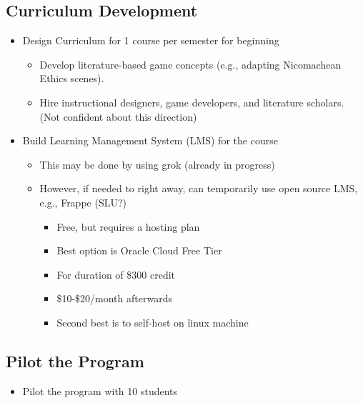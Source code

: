 \documentclass[
  letterpaper,
  DIV=11,
  numbers=noendperiod]{scrreprt}
\providecommand{\tightlist}{%
  \setlength{\itemsep}{0pt}\setlength{\parskip}{0pt}}\usepackage{longtable,booktabs,array}
\begin{document}
\begin{tcolorbox}[enhanced jigsaw, arc=.35mm, breakable, rightrule=.15mm, colback=white, colframe=quarto-callout-important-color-frame, bottomrule=.15mm, leftrule=.75mm, opacityback=0, toprule=.15mm, left=2mm]
\begin{tcolorbox}[enhanced jigsaw, arc=.35mm, breakable, rightrule=.15mm, colback=white, colframe=quarto-callout-tip-color-frame, bottomrule=.15mm, leftrule=.75mm, opacityback=0, toprule=.15mm, left=2mm]
\subsection{Curriculum Development}\label{curriculum-development}

\begin{itemize}
\tightlist
\item
  Design Curriculum for 1 course per semester for beginning

  \begin{itemize}
  \tightlist
  \item
    Develop literature-based game concepts (e.g., adapting Nicomachean
    Ethics scenes).
  \item
    Hire instructional designers, game developers, and literature
    scholars. (Not confident about this direction)
  \end{itemize}
\item
  Build Learning Management System (LMS) for the course

  \begin{itemize}
  \tightlist
  \item
    This may be done by using grok (already in progress)
  \item
    However, if needed to right away, can temporarily use open source
    LMS, e.g., Frappe (SLU?)

    \begin{itemize}
    \tightlist
    \item
      Free, but requires a hosting plan
    \item
      Best option is Oracle Cloud Free Tier
    \item
      For duration of \$300 credit
    \item
      \$10-\$20/month afterwards
    \item
      Second best is to self-host on linux machine
    \end{itemize}
  \end{itemize}
\end{itemize}

\subsection{Pilot the Program}\label{pilot-the-program}

\begin{itemize}
\tightlist
\item
  Pilot the program with 10 students


\end{itemize}
\end{tcolorbox}
\end{tcolorbox}
\end{document}
